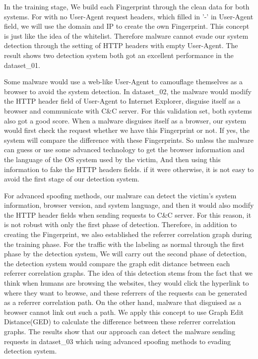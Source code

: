 In the training stage, We build each Fingerprint through the clean data for both systems. For with no User-Agent request headers, which filled in '-' in User-Agent field, we will use the domain and IP to create the own Fingerprint. This concept is just like the idea of the whitelist. Therefore malware cannot evade our system detection through the setting of HTTP headers with empty User-Agent. The result shows two detection system both got an excellent performance in the dataset\_01.

Some malware would use a web-like User-Agent to camouflage themselves as a browser to avoid the system detection. In dataset\_02, the malware would modify the HTTP header field of User-Agent to Internet Explorer, disguise itself as a browser and communicate with C\&C server. For this validation set, both systems also got a good score. When a malware disguises itself as a browser, our system would first check the request whether we have this Fingerprint or not. If yes, the system will compare the difference with these Fingerprints. So unless the malware can guess or use some advanced technology to get the browser information and the language of the OS system used by the victim, And then using this information to fake the HTTP headers fields. if it were otherwise, it is not easy to avoid the first stage of our detection system.

For advanced spoofing methods, our malware can detect the victim's system information, browser version, and system language, and then it would also modify the HTTP header fields when sending requests to C\&C server. For this reason, it is not robust with only the first phase of detection. Therefore, in addition to creating the Fingerprint, we also established the referrer correlation graph during the training phase. For the traffic with the labeling as normal through the first phase by the detection system, We will carry out the second phase of detection, the detection system would compare the graph edit distance between each referrer correlation graphs. The idea of this detection stems from the fact that we think when humans are browsing the websites, they would click the hyperlink to where they want to browse, and these referrers of the requests can be generated as a referrer correlation path. On the other hand, malware that disguised as a browser cannot link out such a path. We apply this concept to use Graph Edit Distance(GED) to calculate the difference between these referrer correlation graphs. The results show that our approach can detect the malware sending requests in dataset\_03 which using advanced spoofing methods to evading detection system.


